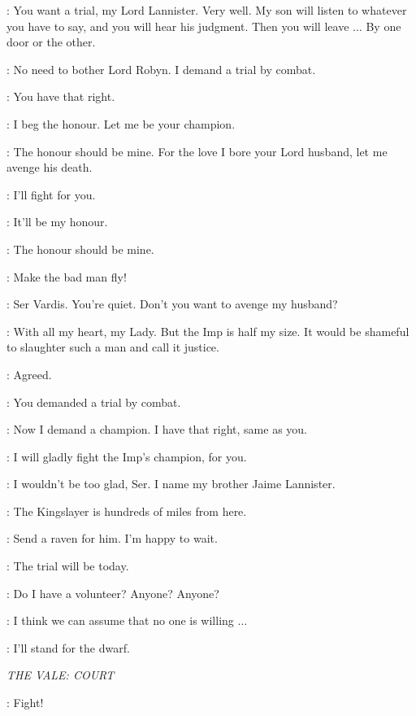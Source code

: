\LYSA: You want a trial, my Lord Lannister. Very well. My son will listen to whatever you have to say, and you will hear his judgment. Then you will leave $\ldots$ By one door or the other. 

\TYRION: No need to bother Lord Robyn. I demand a trial by combat. 

\LYSA: You have that right. 

\KNIGHTa: I beg the honour. Let me be your champion. 

\KNIGHTb: The honour should be mine. For the love I bore your Lord husband, let me avenge his death. 

\KNIGHTc: I'll fight for you. 

\KNIGHTd: It'll be my honour. 

\KNIGHTe: The honour should be mine. 

\ROBYN: Make the bad man fly! 

\LYSA: Ser Vardis. You're quiet. Don't you want to avenge my husband? 

\VARDIS: With all my heart, my Lady. But the Imp is half my size. It would be shameful to slaughter such a man and call it justice. 

\TYRION: Agreed. 

\LYSA: You demanded a trial by combat. 

\TYRION: Now I demand a champion. I have that right, same as you. 

\VARDIS: I will gladly fight the Imp's champion, for you. 

\TYRION: I wouldn't be too glad, Ser. I name my brother Jaime Lannister. 

\LYSA: The Kingslayer is hundreds of miles from here. 

\TYRION: Send a raven for him. I'm happy to wait. 

\LYSA: The trial will be today. 

\TYRION: Do I have a volunteer? Anyone? Anyone? 

\LYSA: I think we can assume that no one is willing $\ldots$ 

\BRONN: I'll stand for the dwarf. 

\scene

\textit{THE VALE: COURT} 


\ROBYN: Fight!


